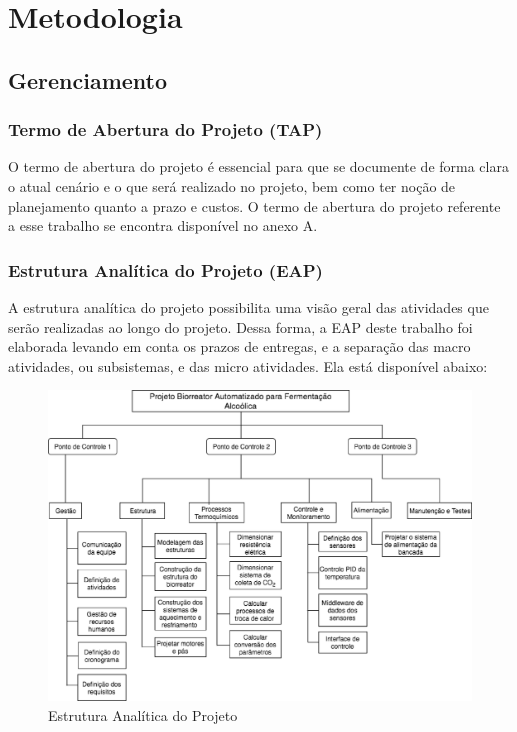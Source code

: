 \chapter[Metodologia]{Metodologia}

\section{Gerenciamento}

\subsection{Termo de Abertura do Projeto (TAP)}

O termo de abertura do projeto é essencial para que se documente de forma clara o atual cenário e o que será realizado no projeto, bem como ter noção de planejamento quanto a prazo e custos. O termo de abertura do projeto referente a esse trabalho se encontra disponível no anexo A.

\subsection{Estrutura Analítica do Projeto (EAP)}

A estrutura analítica do projeto possibilita uma visão geral das atividades que serão realizadas ao longo do projeto. Dessa forma, a EAP deste trabalho foi elaborada levando em conta os prazos de entregas, e a separação das macro atividades, ou subsistemas, e das micro atividades. Ela está disponível abaixo:

\begin{figure}[h]
	\centering
	\includegraphics[keepaspectratio=true,scale=0.8, width=\textwidth]{figuras/eap.eps}
	\caption{Estrutura Analítica do Projeto}
	\label{eap}
\end{figure}

